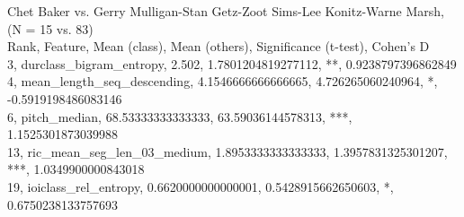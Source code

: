 Chet Baker vs. Gerry Mulligan-Stan Getz-Zoot Sims-Lee Konitz-Warne Marsh, (N = 15 vs. 83)\\
Rank, Feature, Mean (class), Mean (others), Significance (t-test), Cohen's D\\
3, durclass_bigram_entropy, 2.502, 1.7801204819277112, **, 0.9238797396862849\\
4, mean_length_seq_descending, 4.1546666666666665, 4.726265060240964, *, -0.5919198486083146\\
6, pitch_median, 68.53333333333333, 63.59036144578313, ***, 1.1525301873039988\\
13, ric_mean_seg_len_03_medium, 1.8953333333333333, 1.3957831325301207, ***, 1.0349900000843018\\
19, ioiclass_rel_entropy, 0.6620000000000001, 0.5428915662650603, *, 0.6750238133757693\\
